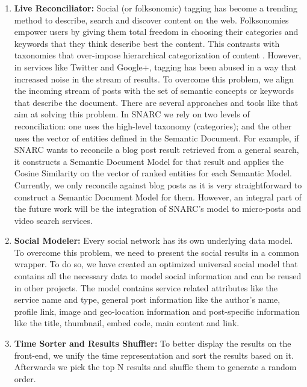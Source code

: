 \documentclass[onecolumn, crcready]{iosart2c}
\begin{document}
\begin{enumerate}
\item {\bf Live Reconciliator:} Social (or folksonomic) tagging has become a trending method to describe, search and discover content on the web. Folksonomies empower users by giving them total freedom in choosing their categories and keywords that they think describe best the content. This contrasts with taxonomies that over-impose hierarchical categorization of content \cite{Zanardi2008}. However, in services like Twitter and Google+, tagging has been abused in a way that increased noise in the stream of results. To overcome this problem, we align the incoming stream of posts with the set of semantic concepts or keywords that describe the document. There are several approaches and tools like \cite{Cantador2011,Diaz-Aviles2012,Preotiuc-Pietro2012,Zanardi2008} that aim at solving this problem. In SNARC we rely on two levels of reconciliation: one uses the high-level taxonomy (categories); and the other uses the vector of entities defined in the Semantic Document. For example, if SNARC wants to reconcile a blog post result retrieved from a general search, it constructs a Semantic Document Model for that result and applies the Cosine Similarity on the vector of ranked entities for each Semantic Model. Currently, we only reconcile against blog posts as it is very straightforward to construct a Semantic Document Model for them. However, an integral part of the future work will be the integration of SNARC's model to micro-posts and video search services.

\item {\bf Social Modeler:} Every social network has its own underlying data model. To overcome this problem, we need to present the social results in a common wrapper. To do so, we have created an optimized universal social model that contains all the necessary data to model social information and can be reused in other projects. The model contains service related attributes like the service name and type, general post information like the author's name, profile link, image and geo-location information and post-specific information like the title, thumbnail, embed code, main content and link. 
\item {\bf Time Sorter and Results Shuffler:} To better display the results on the front-end, we unify the time representation and sort the results based on it. Afterwards we pick the top N results and shuffle them to generate a random order.
\end{enumerate}
\end{document}
